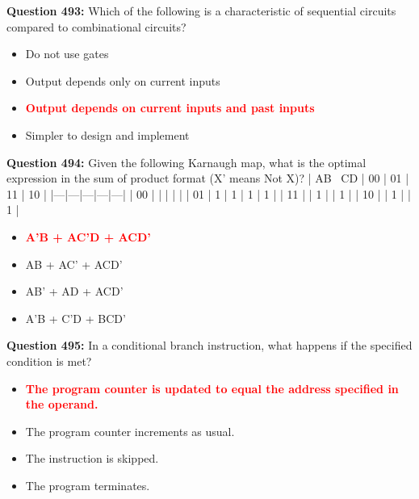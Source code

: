 \documentclass[12pt,a4paper]{article}
\begin{document}
\vspace{0.5cm}

\textbf{Question 493:} Which of the following is a characteristic of sequential circuits compared to combinational circuits?

\begin{itemize}
    \item[\textbf{A.}] Do not use gates
    \item[\textbf{B.}] Output depends only on current inputs
    \item[\textbf{C.}] \textcolor{red}{\textbf{Output depends on current inputs and past inputs}}
    \item[\textbf{D.}] Simpler to design and implement
\end{itemize}

\vspace{0.5cm}

\textbf{Question 494:} Given the following Karnaugh map, what is the optimal expression in the sum of product format (X' means Not X)?
| AB \ CD | 00 | 01 | 11 | 10 |
|---|---|---|---|---|
| 00 | | | | |
| 01 | 1 | 1 | 1 | 1 |
| 11 | | 1 | | 1 |
| 10 | | 1 | | 1 |

\begin{itemize}
    \item[\textbf{A.}] \textcolor{red}{\textbf{A'B + AC'D + ACD'}}
    \item[\textbf{B.}] AB + AC' + ACD'
    \item[\textbf{C.}] AB' + AD + ACD'
    \item[\textbf{D.}] A'B + C'D + BCD'
\end{itemize}

\vspace{0.5cm}

\textbf{Question 495:} In a conditional branch instruction, what happens if the specified condition is met?

\begin{itemize}
    \item[\textbf{A.}] \textcolor{red}{\textbf{The program counter is updated to equal the address specified in the operand.}}
    \item[\textbf{B.}] The program counter increments as usual.
    \item[\textbf{C.}] The instruction is skipped.
    \item[\textbf{D.}] The program terminates.
\end{itemize}

\vspace{0.5cm}
\end{document}
